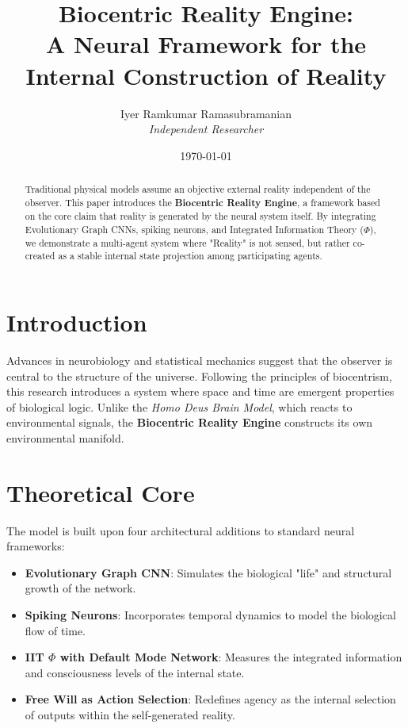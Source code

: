 \documentclass[12pt]{article}
\title{\textbf{Biocentric Reality Engine: \\ A Neural Framework for the Internal Construction of Reality}}
\author{Iyer Ramkumar Ramasubramanian \\ \textit{Independent Researcher}}
\date{\today}
\begin{document}
\maketitle

\begin{abstract}
Traditional physical models assume an objective external reality independent of the observer. This paper introduces the \textbf{Biocentric Reality Engine}, a framework based on the core claim that reality is generated by the neural system itself. By integrating Evolutionary Graph CNNs, spiking neurons, and Integrated Information Theory ($\Phi$), we demonstrate a multi-agent system where "Reality" is not sensed, but rather co-created as a stable internal state projection among participating agents.
\end{abstract}

\section{Introduction}
Advances in neurobiology and statistical mechanics suggest that the observer is central to the structure of the universe. Following the principles of biocentrism, this research introduces a system where space and time are emergent properties of biological logic. Unlike the \textit{Homo Deus Brain Model}, which reacts to environmental signals, the \textbf{Biocentric Reality Engine} constructs its own environmental manifold.

\section{Theoretical Core}

The model is built upon four architectural additions to standard neural frameworks:

\begin{itemize}
\item \textbf{Evolutionary Graph CNN}: Simulates the biological "life" and structural growth of the network.
\item \textbf{Spiking Neurons}: Incorporates temporal dynamics to model the biological flow of time.
\item \textbf{IIT $\Phi$ with Default Mode Network}: Measures the integrated information and consciousness levels of the internal state.
\item \textbf{Free Will as Action Selection}: Redefines agency as the internal selection of outputs within the self-generated reality.
\end{itemize}
\end{document}
